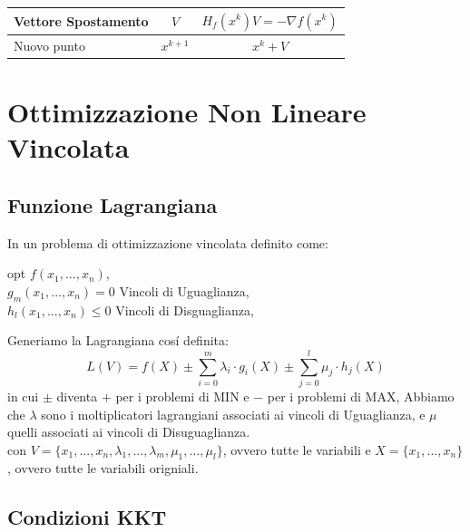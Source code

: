 \documentclass[12pt, a4paper, openany]{book}
\begin{document}
\begin{center}
	\begin{tabular}{|l|c|c|}
		\hline
		Vettore Spostamento &$V$& $H_f(x^k) V = - \nabla f(x^k)$\\
		\hline
		Nuovo punto & $x^{k+1}$ & $ x^k + V $\\
		\hline
	\end{tabular}
\end{center}


\chapter{Ottimizzazione Non Lineare Vincolata}
\section{Funzione Lagrangiana}
In un problema di ottimizzazione vincolata definito come:
\begin{center}
	opt $f(x_1,...,x_n)$,
	\\
	$g_m(x_1,...,x_n) = 0$ Vincoli di Uguaglianza,
	\\
	$h_l(x_1,...,x_n) \leq 0$ Vincoli di Disguaglianza,
\end{center}
Generiamo la Lagrangiana cosí definita:
\[
	L(V) = f(X) \pm \sum_{i=0}^{m} \lambda_i \cdot g_i(X) \pm \sum_{j=0}^{l} \mu_j \cdot h_j(X)
\]
in cui $\pm$ diventa $+$ per i problemi di MIN e $-$ per i problemi di MAX,
Abbiamo che $\lambda$ sono i moltiplicatori lagrangiani associati ai vincoli di Uguaglianza, e $\mu$ quelli associati ai vincoli di Disuguaglianza.
\\\small{con $V=\{x_1,...,x_n,\lambda_1,...,\lambda_m, \mu_1,...,\mu_l\}$, ovvero tutte le variabili e $X=\{x_1,...,x_n\}$, ovvero tutte le variabili origniali.}

\section{Condizioni KKT}
\end{document}
